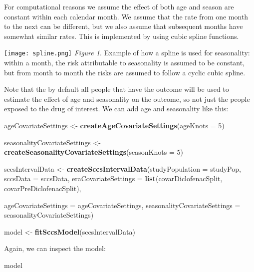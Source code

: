 \documentclass[
]{article}
\newenvironment{Shaded}{\begin{snugshade}}{\end{snugshade}}
\newcommand{\DataTypeTok}[1]{\textcolor[rgb]{0.13,0.29,0.53}{#1}}
\newcommand{\DecValTok}[1]{\textcolor[rgb]{0.00,0.00,0.81}{#1}}
\newcommand{\KeywordTok}[1]{\textcolor[rgb]{0.13,0.29,0.53}{\textbf{#1}}}
\newcommand{\NormalTok}[1]{#1}
\newcommand{\StringTok}[1]{\textcolor[rgb]{0.31,0.60,0.02}{#1}}
\begin{document}
For computational reasons we assume the effect of both age and season
are constant within each calendar month. We assume that the rate from
one month to the next can be different, but we also assume that
subsequent months have somewhat similar rates. This is implemented by
using cubic spline functions.

\texttt{[image: spline.png]} \emph{Figure 1}. Example of how a spline is
used for seasonality: within a month, the risk attributable to
seasonality is assumed to be constant, but from month to month the risks
are assumed to follow a cyclic cubic spline.

Note that the by default all people that have the outcome will be used
to estimate the effect of age and seasonality on the outcome, so not
just the people exposed to the drug of interest. We can add age and
seasonality like this:

\begin{Shaded}
\begin{Highlighting}[]
\NormalTok{ageCovariateSettings <-}\StringTok{ }\KeywordTok{createAgeCovariateSettings}\NormalTok{(}\DataTypeTok{ageKnots =} \DecValTok{5}\NormalTok{)}

\NormalTok{seasonalityCovariateSettings <-}\StringTok{ }\KeywordTok{createSeasonalityCovariateSettings}\NormalTok{(}\DataTypeTok{seasonKnots =} \DecValTok{5}\NormalTok{)}

\NormalTok{sccsIntervalData <-}\StringTok{ }\KeywordTok{createSccsIntervalData}\NormalTok{(}\DataTypeTok{studyPopulation =}\NormalTok{ studyPop,}
                                           \DataTypeTok{sccsData =}\NormalTok{ sccsData,}
                                           \DataTypeTok{eraCovariateSettings =} \KeywordTok{list}\NormalTok{(covarDiclofenacSplit,}
\NormalTok{                                                                       covarPreDiclofenacSplit),}

                                           \DataTypeTok{ageCovariateSettings =}\NormalTok{ ageCovariateSettings,}
                                           \DataTypeTok{seasonalityCovariateSettings =}\NormalTok{ seasonalityCovariateSettings)}
  
\NormalTok{model <-}\StringTok{ }\KeywordTok{fitSccsModel}\NormalTok{(sccsIntervalData)}
\end{Highlighting}
\end{Shaded}

Again, we can inspect the model:

\begin{Shaded}
\begin{Highlighting}[]
\NormalTok{model}
\end{Highlighting}
\end{Shaded}
\end{document}
